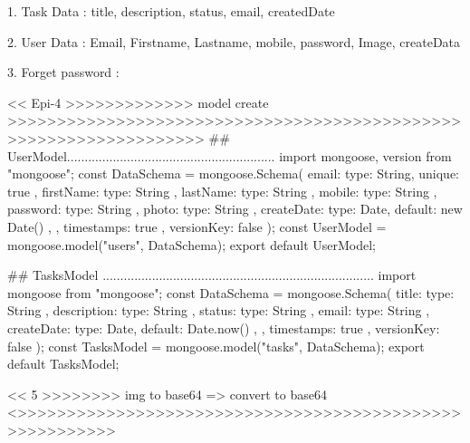 1. Task Data : 
   title, description, status, email, createdDate

2. User Data : 
   Email, Firstname, Lastname, mobile, password, Image, createData

3. Forget password : 
   

<< Epi-4 >>>>>>>>>>>>> model create >>>>>>>>>>>>>>>>>>>>>>>>>>>>>>>>>>>>>>>>>>>>>>>>>>>>>>>>>>>>>>>>>>
   ## UserModel...........................................................
   import mongoose, { version } from "mongoose";
   const DataSchema = mongoose.Schema(
     {
       email: { type: String, unique: true },
       firstName: { type: String },
       lastName: { type: String },
       mobile: { type: String },
       password: { type: String },
       photo: { type: String },
       createDate: { type: Date, default: new Date() },
     },
     { timestamps: true },
     { versionKey: false }
   );
   const UserModel = mongoose.model("users", DataSchema);
   export default UserModel;

   ## TasksModel .............................................................................
   import mongoose from "mongoose";
   const DataSchema = mongoose.Schema(
     {
       title: { type: String },
       description: { type: String },
       status: { type: String },
       email: { type: String },
       createDate: { type: Date, default: Date.now() },
     },
     { timestamps: true },
     { versionKey: false }
   );
   const TasksModel = mongoose.model("tasks", DataSchema);
   export default TasksModel;

   << 5 >>>>>>>> img to base64 => convert to base64 <>>>>>>>>>>>>>>>>>>>>>>>>>>>>>>>>>>>>>>>>>>>>>>>>>>>>>>>>